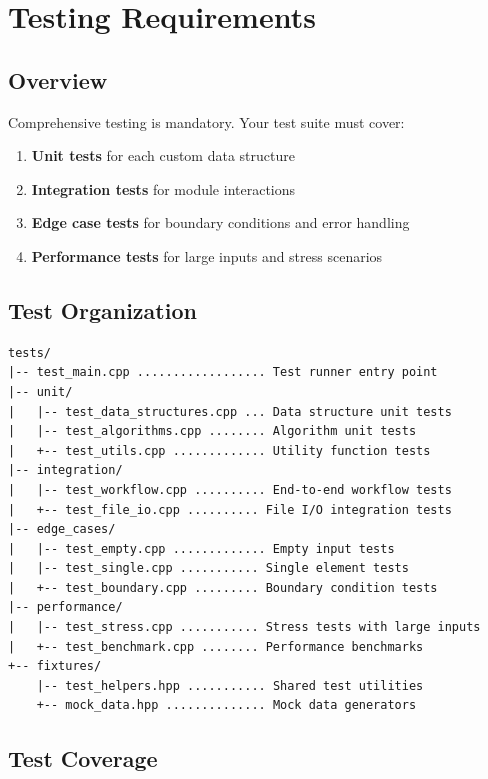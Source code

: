 
\section{Testing Requirements}

\subsection{Overview}

Comprehensive testing is mandatory. Your test suite must cover:

\begin{enumerate}
  \item \textbf{Unit tests} for each custom data structure
  \item \textbf{Integration tests} for module interactions
  \item \textbf{Edge case tests} for boundary conditions and error handling
  \item \textbf{Performance tests} for large inputs and stress scenarios
\end{enumerate}

\subsection{Test Organization}

\begin{lstlisting}[style=tree]
tests/
|-- test_main.cpp .................. Test runner entry point
|-- unit/
|   |-- test_data_structures.cpp ... Data structure unit tests
|   |-- test_algorithms.cpp ........ Algorithm unit tests
|   +-- test_utils.cpp ............. Utility function tests
|-- integration/
|   |-- test_workflow.cpp .......... End-to-end workflow tests
|   +-- test_file_io.cpp .......... File I/O integration tests
|-- edge_cases/
|   |-- test_empty.cpp ............. Empty input tests
|   |-- test_single.cpp ........... Single element tests
|   +-- test_boundary.cpp ......... Boundary condition tests
|-- performance/
|   |-- test_stress.cpp ........... Stress tests with large inputs
|   +-- test_benchmark.cpp ........ Performance benchmarks
+-- fixtures/
    |-- test_helpers.hpp ........... Shared test utilities
    +-- mock_data.hpp .............. Mock data generators
\end{lstlisting}

\subsection{Test Coverage}

